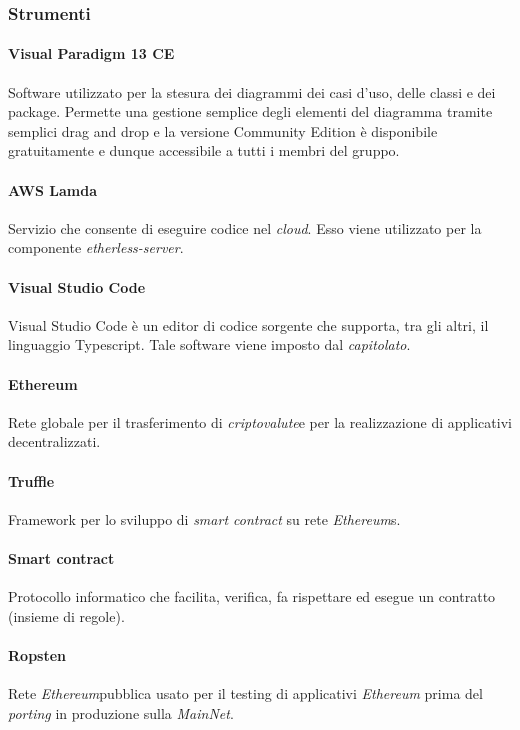 \subsubsection{Strumenti}
\paragraph{Visual Paradigm 13 CE}
Software utilizzato per la stesura dei diagrammi dei casi d'uso, delle classi e dei package. Permette una gestione semplice degli elementi del diagramma tramite semplici drag and drop e la versione Community Edition è disponibile gratuitamente e dunque accessibile a tutti i membri del gruppo.

\paragraph{AWS Lamda}
Servizio che consente di eseguire codice nel \textit{cloud}\glos. Esso viene utilizzato per la componente \textit{etherless-server}.

\paragraph{Visual Studio Code}
Visual Studio Code è un editor di codice sorgente che supporta, tra gli altri, il linguaggio Typescript. Tale software viene imposto dal \textit{capitolato\glos}.

\paragraph{Ethereum\glo}
Rete globale per il trasferimento di \textit{criptovalute}\glo e per la realizzazione di applicativi decentralizzati.

\paragraph{Truffle}
Framework per lo sviluppo di \textit{smart contract\glo} su rete \textit{Ethereum\glo}s.

\paragraph{Smart contract\glo}
Protocollo informatico che facilita, verifica, fa rispettare ed esegue un
contratto (insieme di regole).

\paragraph{Ropsten}
Rete \textit{Ethereum}\glo pubblica usato per il testing di applicativi \textit{Ethereum\glo} prima
del \textit{porting\glo} in produzione sulla \textit{MainNet\glos}.

